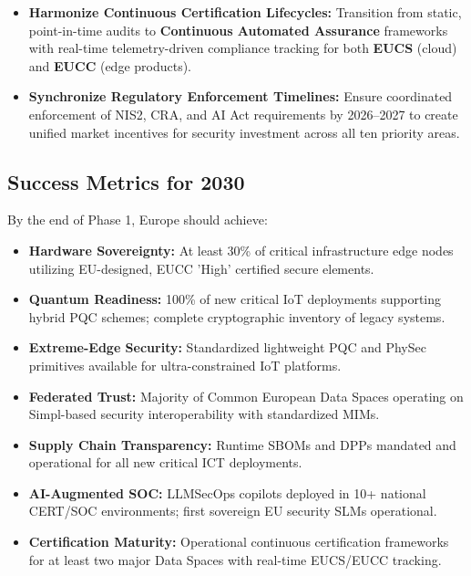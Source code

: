 \documentclass[12pt,a4paper]{article}
\begin{document}
\begin{itemize}
    \item \textbf{Harmonize Continuous Certification Lifecycles:} Transition from static, point-in-time audits to \textbf{Continuous Automated Assurance} frameworks with real-time telemetry-driven compliance tracking for both \textbf{EUCS} (cloud) and \textbf{EUCC} (edge products).
    
    \item \textbf{Synchronize Regulatory Enforcement Timelines:} Ensure coordinated enforcement of NIS2, CRA, and AI Act requirements by 2026--2027 to create unified market incentives for security investment across all ten priority areas.
\end{itemize}

\subsection*{Success Metrics for 2030}
By the end of Phase 1, Europe should achieve:
\begin{itemize}
    \item \textbf{Hardware Sovereignty:} At least 30\% of critical infrastructure edge nodes utilizing EU-designed, EUCC 'High' certified secure elements.
    \item \textbf{Quantum Readiness:} 100\% of new critical IoT deployments supporting hybrid PQC schemes; complete cryptographic inventory of legacy systems.
    \item \textbf{Extreme-Edge Security:} Standardized lightweight PQC and PhySec primitives available for ultra-constrained IoT platforms.
    \item \textbf{Federated Trust:} Majority of Common European Data Spaces operating on Simpl-based security interoperability with standardized MIMs.
    \item \textbf{Supply Chain Transparency:} Runtime SBOMs and DPPs mandated and operational for all new critical ICT deployments.
    \item \textbf{AI-Augmented SOC:} LLMSecOps copilots deployed in 10+ national CERT/SOC environments; first sovereign EU security SLMs operational.
    \item \textbf{Certification Maturity:} Operational continuous certification frameworks for at least two major Data Spaces with real-time EUCS/EUCC tracking.
\end{itemize}




\newpage
\appendix
\end{document}
